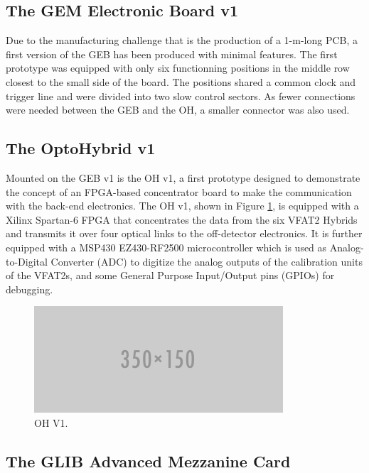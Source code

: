     \subsection{The GEM Electronic Board v1}

      Due to the manufacturing challenge that is the production of a 1-m-long PCB, a first version of the GEB has been produced with minimal features. The first prototype was equipped with only six functionning positions in the middle row closest to the small side of the board. The positions shared a common clock and trigger line and were divided into two slow control sectors. As fewer connections were needed between the GEB and the OH, a smaller connector was also used.

    \subsection{The OptoHybrid v1}

      Mounted on the GEB v1 is the OH v1, a first prototype designed to demonstrate the concept of an FPGA-based concentrator board to make the communication with the back-end electronics. The OH v1, shown in Figure \ref{fig:II-2-daq-ohv1}, is equipped with a Xilinx Spartan-6 FPGA that concentrates the data from the six VFAT2 Hybrids and transmits it over four optical links to the off-detector electronics. It is further equipped with a MSP430 EZ430-RF2500 \cite{MSP430} microcontroller which is used as Analog-to-Digital Converter (ADC) to digitize the analog outputs of the calibration units of the VFAT2s, and some General Purpose Input/Output pins (GPIOs) for debugging.

      \begin{figure}[h!]
        \centering
        \includegraphics[width=\textwidth]{img/empty.png}
        \caption{OH V1.}
        \label{fig:II-2-daq-ohv1}
      \end{figure}

    \subsection{The GLIB Advanced Mezzanine Card}

